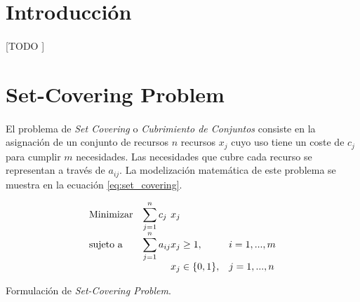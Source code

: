 \documentclass[spanish]{article}
\begin{document}
	\maketitle %

	\thispagestyle{fancy} %



	\begin{abstract}
		\noindent [TODO ]
	\end{abstract}


	\section{Introducción}

		\paragraph{}
		[TODO ]

	\setcounter{section}{5}

	\section{Set-Covering Problem}
	\label{sec:e-6}

		\paragraph{}
		El problema de \emph{Set Covering} o \emph{Cubrimiento de Conjuntos} consiste en la asignación de un conjunto de recursos $n$ recursos $x_{j}$ cuyo uso tiene un coste de $c_{j}$ para cumplir $m$ necesidades. Las necesidades que cubre cada recurso se representan a través de $a_{ij}$. La modelización matemática de este problema se muestra en la ecuación \eqref{eq:set_covering}.

		\begin{eqfloat}
			\begin{equation}
				\begin{array}{ll@{}ll}
					\text{Minimizar}	& \displaystyle\sum\limits_{j=1}^{n} c_{j}	&	x_{j} &\\
					\text{sujeto a}		& \displaystyle\sum\limits_{j = 1}^n a_{ij}	&	x_{j} \geq 1,  &i=1 ,..., m\\
														&                                           &	x_{j} \in \{0,1\}, &j=1 ,..., n
				\end{array}
			\end{equation}
			\caption{Formulación de \emph{Set-Covering Problem}.}
			\label{eq:set_covering}
		\end{eqfloat}
\end{document}
